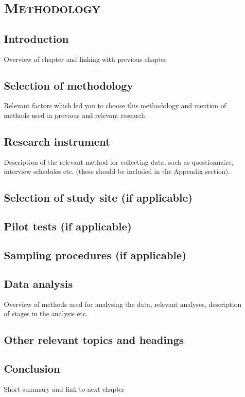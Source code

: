 %
%
% 
% 
% 

\chapter{\textsc{Methodology}}
\label{chap:method}

\section{Introduction}
\label{sec:introcap3}
Overview of chapter and linking with previous chapter

\section{Selection of methodology}
\label{sec:selectionmethod}

Relevant factors which led you to choose this methodology and mention of methods used in previous and relevant research

\section{Research instrument}
\label{sec:researchinstrument}

Description of the relevant method for collecting data, such as questionnaire, interview schedules etc. (these should be included in the Appendix section). 

\section{Selection of study site (if applicable)}

\section{Pilot tests (if applicable)}

\section{Sampling procedures (if applicable) }

\section{Data analysis}
\label{sec:dataanalysis}

Overview of methods used for analysing the data, relevant analyses, description of stages in the analysis etc. 

\section{Other relevant topics and headings}
\label{sec:othertopics}

\section{Conclusion}
\label{sec:conclucionchapter3}
Short summary and link to next chapter

